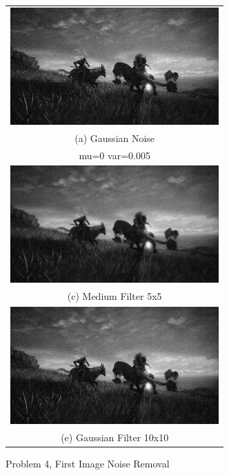 \documentclass[conference]{IEEEtran}
\begin{document}
\begin{figure}
    \begin{tabular}{c}
        \includegraphics[width=8cm]{images/eldenring_noise_1.jpg} \\
        (a) Gaussian Noise \\[6pt]
        mu=0 var=0.005 \\[6pt]
        \includegraphics[width=8cm]{images/eldenring_average_1.jpg} \\
        (c) Medium Filter 5x5 \\[6pt]
        \includegraphics[width=8cm]{images/eldenring_g_1.jpg} \\
        (e) Gaussian Filter 10x10 \\[6pt]
    \end{tabular}
    \caption{Problem 4, First Image Noise Removal}
\end{figure}
\end{document}
